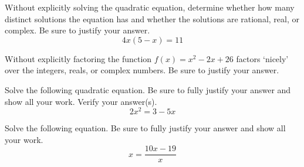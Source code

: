 \documentclass[11pt,letterpaper]{article}
\begin{document}

 Without explicitly solving the quadratic equation, determine whether how many distinct solutions the equation has and whether the solutions are rational, real, or complex. Be sure to justify your answer.
	\[
	4x(5 - x)= 11
	\]



\newpage



 Without explicitly factoring the function $f(x)= x^2 - 2x + 26$ factors `nicely' over the integers, reals, or complex numbers. Be sure to justify your answer. 



\newpage



 Solve the following quadratic equation. Be sure to fully justify your answer and show all your work. Verify your answer(s).
	\[
	2x^2= 3 - 5x
	\]



\newpage



 Solve the following equation. Be sure to fully justify your answer and show all your work.
	\[
	x= \dfrac{10x - 19}{x}
	\]
\end{document}
